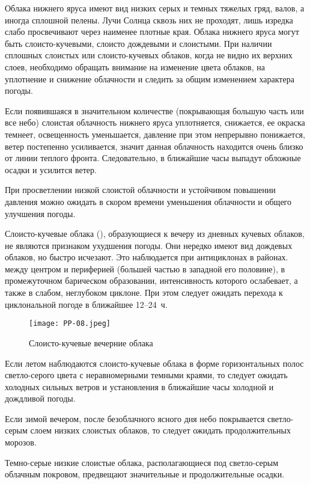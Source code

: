 Облака нижнего яруса имеют вид низких серых и темных тяжелых гряд,
валов, а иногда сплошной пелены. Лучи Солнца сквозь них не проходят,
лишь изредка слабо просвечивают через наименее плотные края. Облака
нижнего яруса могут быть слоисто-кучевыми, слоисто дождевыми и
слоистыми. При наличии сплошных слоистых или слоисто-кучевых облаков,
когда не видно их верхних слоев, необходимо обращать внимание на
изменение цвета облаков, на уплотнение и снижение облачности и следить
за общим изменением характера погоды.

 Если появившаяся в значительном количестве (покрывающая большую
часть или все небо) слоистая облачность нижнего яруса уплотняется,
снижается, ее окраска темнеет, освещенность уменьшается, давление при
этом непрерывно понижается, ветер постепенно усиливается, значит
данная облачность находится очень близко от линии теплого
фронта. Следовательно, в ближайшие часы выпадут обложные осадки и
усилится ветер.

 При просветлении низкой слоистой облачности и устойчивом
повышении давления можно ожидать в скором времени уменьшения
облачности и общего улучшения погоды.

 Слоисто-кучевые облака (), образующиеся к вечеру из
дневных кучевых облаков, не являются признаком ухудшения погоды. Они
нередко имеют вид дождевых облаков, но быстро исчезают. Это
наблюдается при антициклонах в районах. между центром и периферией
(большей частью в западной его половине), в промежуточном барическом
образовании, интенсивность которого ослабевает, а также в слабом,
неглубоком циклоне. При этом следует ожидать перехода к циклональной
погоде в ближайшее 12--24~ч.

\begin{figure}[htb]
  \centering{}
  \texttt{[image: PP-08.jpeg]}
  \caption{Слоисто-кучевые вечерние облака}
  \label{fig:pp08}
  \small
  \centering{}
\end{figure}

 Если летом наблюдаются слоисто-кучевые облака в форме
горизонтальных полос светло-серого цвета с неравномерными темными
краями, то следует ожидать холодных сильных ветров и установления в
ближайшие часы холодной и дождливой погоды.

 Если зимой вечером, после безоблачного ясного дня небо
покрывается светло-серым слоем низких слоистых облаков, то следует
ожидать продолжительных морозов.

 Темно-серые низкие слоистые облака, располагающиеся под
светло-серым облачным покровом, предвещают значительные и
продолжительные осадки.

